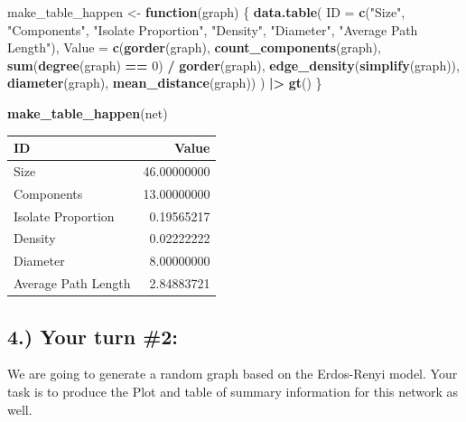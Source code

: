\documentclass[
]{article}
\newenvironment{Shaded}{\begin{snugshade}}{\end{snugshade}}
\newcommand{\AttributeTok}[1]{\textcolor[rgb]{0.13,0.29,0.53}{#1}}
\newcommand{\ControlFlowTok}[1]{\textcolor[rgb]{0.13,0.29,0.53}{\textbf{#1}}}
\newcommand{\DecValTok}[1]{\textcolor[rgb]{0.00,0.00,0.81}{#1}}
\newcommand{\FunctionTok}[1]{\textcolor[rgb]{0.13,0.29,0.53}{\textbf{#1}}}
\newcommand{\NormalTok}[1]{#1}
\newcommand{\OtherTok}[1]{\textcolor[rgb]{0.56,0.35,0.01}{#1}}
\newcommand{\SpecialCharTok}[1]{\textcolor[rgb]{0.81,0.36,0.00}{\textbf{#1}}}
\newcommand{\StringTok}[1]{\textcolor[rgb]{0.31,0.60,0.02}{#1}}
\begin{document}
\begin{Shaded}
\begin{Highlighting}[]
\NormalTok{make\_table\_happen }\OtherTok{\textless{}{-}} \ControlFlowTok{function}\NormalTok{(graph) \{}
  \FunctionTok{data.table}\NormalTok{(}
    \AttributeTok{ID =} \FunctionTok{c}\NormalTok{(}\StringTok{"Size"}\NormalTok{, }\StringTok{"Components"}\NormalTok{, }\StringTok{"Isolate Proportion"}\NormalTok{, }\StringTok{"Density"}\NormalTok{, }\StringTok{"Diameter"}\NormalTok{, }\StringTok{"Average Path Length"}\NormalTok{),}
    \AttributeTok{Value =} \FunctionTok{c}\NormalTok{(}\FunctionTok{gorder}\NormalTok{(graph), }\FunctionTok{count\_components}\NormalTok{(graph), }\FunctionTok{sum}\NormalTok{(}\FunctionTok{degree}\NormalTok{(graph) }\SpecialCharTok{==} \DecValTok{0}\NormalTok{) }\SpecialCharTok{/} \FunctionTok{gorder}\NormalTok{(graph), }\FunctionTok{edge\_density}\NormalTok{(}\FunctionTok{simplify}\NormalTok{(graph)), }\FunctionTok{diameter}\NormalTok{(graph), }\FunctionTok{mean\_distance}\NormalTok{(graph))}
\NormalTok{  ) }\SpecialCharTok{|\textgreater{}}
    \FunctionTok{gt}\NormalTok{()}
\NormalTok{\}}

\FunctionTok{make\_table\_happen}\NormalTok{(net)}
\end{Highlighting}
\end{Shaded}

\begin{table}[t]
\fontsize{12.0pt}{14.0pt}\selectfont
\begin{tabular*}{\linewidth}{@{\extracolsep{\fill}}lr}
\toprule
ID & Value \\ 
\midrule\addlinespace[2.5pt]
Size & 46.00000000 \\ 
Components & 13.00000000 \\ 
Isolate Proportion & 0.19565217 \\ 
Density & 0.02222222 \\ 
Diameter & 8.00000000 \\ 
Average Path Length & 2.84883721 \\ 
\bottomrule
\end{tabular*}
\end{table}

\subsection{4.) Your turn \#2:}\label{your-turn-2}

We are going to generate a random graph based on the Erdos-Renyi model.
Your task is to produce the Plot and table of summary information for
this network as well.
\end{document}
